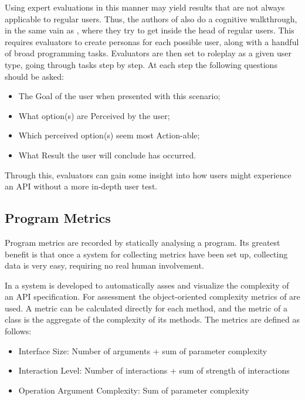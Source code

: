 Using expert evaluations in this manner may yield results that are not always applicable to regular users.
Thus, the authors of \cite{beaton2008usability} also do a cognitive walkthrough, in the same vain as \citet{o2010api}, where they try to get inside the head of regular users. 
This requires evaluators to create personas for each possible user, along with a handful of broad programming tasks.
Evaluators are then set to roleplay as a given user type, going through tasks step by step. 
At each step the following questions should be asked: 
\begin{itemize}
\item The Goal of the user when presented with this scenario;
\item  What option(s) are Perceived by the user;
\item Which perceived option(s) seem most Action-able;
\item What Result the user will conclude has occurred.
\end{itemize}
Through this, evaluators can gain some insight into how users might experience an \gls{API} without a more in-depth user test.

\subsection{Program Metrics}
Program metrics are recorded by statically analysing a program.
Its greatest benefit is that once a system for collecting metrics have been set up, collecting data is very easy, requiring no real human involvement. 

In  \cite{de2009automatic} a system is developed to automatically asses and visualize the complexity of an \gls{API} specification.
For assessment the object-oriented complexity metrics of \citet{bandi2003predicting} are used. 
A metric can be calculated directly for each method, and the metric of a class is the aggregate of the complexity of its methods. 
The metrics are defined as follows:

\begin{itemize}
\item  Interface Size: Number of arguments + sum of parameter complexity
\item Interaction Level: Number of interactions + sum of strength of interactions
\item Operation Argument Complexity: Sum of parameter complexity
\end{itemize} 

